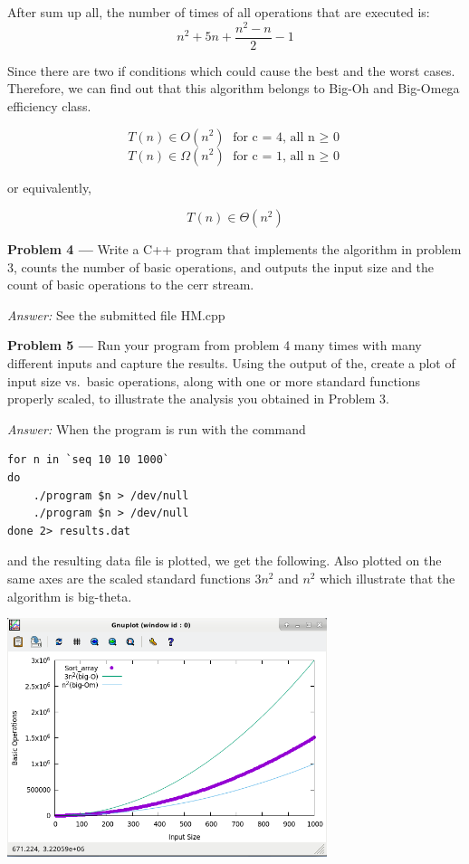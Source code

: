 \documentclass[11pt]{article}
\newcommand{\problem}[1]{\textbf{Problem #1 ---} }
\newcommand{\answer}{\textit{Answer: } }
\begin{document}
After sum up all, the number of times of all operations that are executed is:
\[
n^2+5n+\frac{n^2-n}{2}-1
\]

Since there are two if conditions which could cause the best and the worst cases. Therefore, we can find out that this algorithm belongs to Big-Oh and Big-Omega efficiency class.

\[
    T(n) \in O(n^2) \text{ for c = 4, all n $\geq$ 0}    
\]
\[
    T(n) \in \Omega(n^2) \text{ for c = 1, all n $\geq$ 0}    
\]

or equivalently,

\[
T(n) \in \Theta(n^2)
\]

\problem{4} Write a C++ program that implements the algorithm
in problem 3, counts the number of basic operations, and outputs the
input size and the count of basic operations to the cerr stream. 

\answer See the submitted file HM.cpp

\problem{5} Run your program from problem 4 many times with many
different inputs and capture the results.  Using the output of the,
create a plot of input size vs.\ basic operations, along with one or
more standard functions properly scaled, to illustrate the analysis
you obtained in Problem 3.

\answer When the program is run with the command

\begin{Verbatim}
for n in `seq 10 10 1000`
do
    ./program $n > /dev/null
    ./program $n > /dev/null
done 2> results.dat
\end{Verbatim}

and the resulting data file is plotted, we get the following. Also
plotted on the same axes are the scaled standard functions $3n^2$ and
$n^2$ which illustrate that the algorithm is big-theta.

\begin{center}
  \includegraphics[width=0.7\textwidth]{problem_5.png}
\end{center} 
\end{document}
